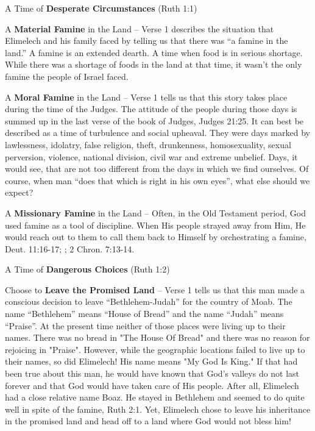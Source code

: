 \begin{compactenum}[I.][7]
    \item A Time of \textbf{Desperate Circumstances} (Ruth 1:1)
    \begin{compactenum}[A.][7]
    	\item A \textbf{Material Famine} in the Land -- Verse 1 describes the situation that Elimelech and his family faced by telling us that there was ``a famine in the land.'' A famine is an extended dearth. A time when food is in serious shortage. While there was a shortage of foods in the land at that time, it wasn't the only famine the people of Israel faced.
    	\item A \textbf{Moral Famine} in the Land -- Verse 1 tells us that this story takes place during the time of the Judges. The attitude of the people during those days is summed up in the last verse of the book of Judges, Judges 21:25. It can best be described as a time of turbulence and social upheaval. They were days marked by lawlessness, idolatry, false religion, theft, drunkenness, homosexuality, sexual perversion, violence, national division, civil war and extreme unbelief. Days, it would see, that are not too different from the days in which we find ourselves. Of course, when man ``does that which is right in his own eyes'', what else should we expect?
    	\item A \textbf{Missionary Famine} in the Land  -- 	Often, in the Old Testament period, God used famine as a tool of discipline. When His people strayed away from Him, He would reach out to them to call them back to Himself by orchestrating a famine, Deut. 11:16-17; ; 2 Chron. 7:13-14.
    \end{compactenum}
	\item A Time of \textbf{Dangerous Choices} (Ruth 1:2)
    \begin{compactenum}[A.][7]
    	\item Choose to \textbf{Leave the Promised Land} -- Verse 1 tells us that this man made a conscious decision to leave ``Bethlehem-Judah'' for the country of Moab. The name ``Bethlehem'' means ``House of Bread'' and the name ``Judah'' means ``Praise''. At the present time neither of those places were living up to their names. There was no bread in "The House Of Bread" and there was no reason for rejoicing in "Praise". However, while the geographic locations failed to live up to their names, so did Elimelech! His name means "My God Is King." If that had been true about this man, he would have known that God's valleys do not last forever and that God would have taken care of His people. After all, Elimelech had a close relative name Boaz. He stayed in Bethlehem and seemed to do quite well in spite of the famine, Ruth 2:1. Yet, Elimelech chose to leave his inheritance in the promised land and head off to a land where God would not bless him!

\end{compactenum}
\end{compactenum}
